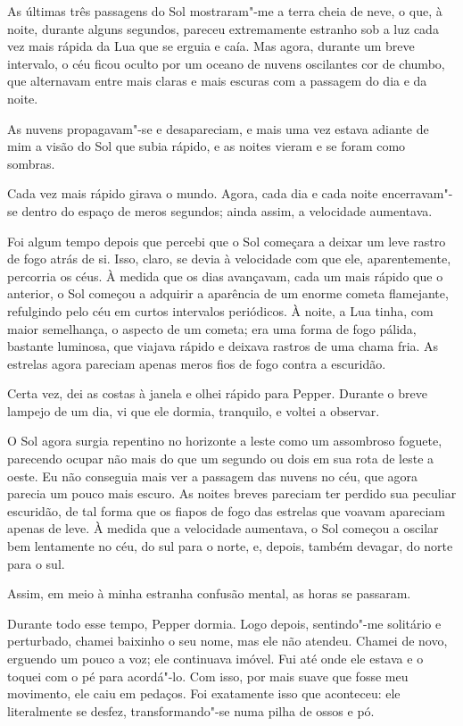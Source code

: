 As últimas três passagens do Sol mostraram"-me a terra cheia de neve, o que, à noite, durante alguns segundos, pareceu
extremamente estranho sob a luz cada vez mais rápida da Lua que se erguia e caía. Mas agora, durante um breve
intervalo, o céu ficou oculto por um oceano de nuvens oscilantes cor de chumbo, que alternavam entre mais claras
e mais escuras com a passagem do dia e da noite.

As nuvens propagavam"-se e desapareciam, e mais uma vez estava adiante de mim a visão do Sol que subia rápido, e as
noites vieram e se foram como sombras.

Cada vez mais rápido girava o mundo. Agora, cada dia e cada noite encerravam"-se dentro do espaço de meros segundos;
ainda assim, a velocidade aumentava.

Foi algum tempo depois que percebi que o Sol começara a deixar um leve rastro de fogo atrás de si. Isso, claro,
se devia à velocidade com que ele, aparentemente, percorria os céus. À medida que os dias avançavam, cada um mais
rápido que o anterior, o Sol começou a adquirir a aparência de um enorme cometa flamejante, refulgindo pelo céu em
curtos intervalos periódicos. À noite, a Lua tinha, com maior semelhança, o aspecto de um cometa; era uma forma de fogo
pálida, bastante luminosa, que viajava rápido e deixava rastros de uma chama fria. As estrelas agora pareciam apenas
meros fios de fogo contra a escuridão.

Certa vez, dei as costas à janela e olhei rápido para Pepper. Durante o breve lampejo de um dia, vi que ele dormia,
tranquilo, e voltei a observar.

O Sol agora surgia repentino no horizonte a leste como um assombroso foguete, parecendo ocupar não mais do que um
segundo ou dois em sua rota de leste a oeste. Eu não conseguia mais ver a passagem das nuvens no céu, que agora parecia
um pouco mais escuro. As noites breves pareciam ter perdido sua peculiar escuridão, de tal forma que os fiapos de fogo
das estrelas que voavam apareciam apenas de leve. À medida que a velocidade aumentava, o Sol começou a oscilar bem
lentamente no céu, do sul para o norte, e, depois, também devagar, do norte para o sul.

Assim, em meio à minha estranha confusão mental, as horas se passaram.

Durante todo esse tempo, Pepper dormia. Logo depois, sentindo"-me solitário e perturbado, chamei baixinho o seu nome,
mas ele não atendeu. Chamei de novo, erguendo um pouco a voz; ele continuava imóvel. Fui até onde ele estava e o
toquei com o pé para acordá"-lo. Com isso, por mais suave que fosse meu movimento, ele caiu em pedaços. Foi exatamente
isso que aconteceu: ele literalmente se desfez, transformando"-se numa pilha de ossos e pó.

